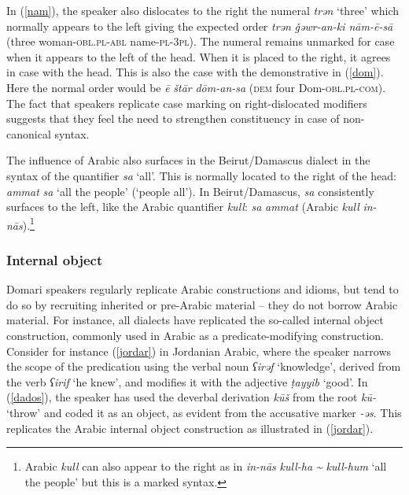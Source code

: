 \documentclass[output=paper]{langsci/langscibook}
\begin{document}
In (\ref{nam}), the speaker also dislocates to the right the numeral \textit{trən} ‘three’ which normally appears to the left giving the expected order \textit{trən} \textit{\v{g}əwr-an-ki nām-ē-sā} (three woman-\textsc{obl}.\textsc{pl}{}-\textsc{abl} name-\textsc{pl}{}-\textsc{3pl}). The numeral remains unmarked for case when it appears to the left of the head. When it is placed to the right, it agrees in case with the head. This is also the case with the demonstrative in (\ref{dom}). Here the normal order would be \textit{ē} \textit{štār} \textit{dōm-an-sa} (\textsc{dem} four Dom-\textsc{obl.pl}{}-\textsc{com}). The fact that speakers replicate case marking on right-dislocated modifiers suggests that they feel the need to strengthen constituency in case of non-canonical syntax.

The influence of Arabic also surfaces in the Beirut/Damascus dialect in the syntax of the quantifier \textit{sa} ‘all’. This is normally located to the right of the head: \textit{ammat} \textit{sa} ‘all the people’ (`people all'). In Beirut/Damascus, \textit{sa} consistently surfaces to the left, like the Arabic quantifier \textit{kull}: \textit{sa} \textit{ammat} (Arabic \textit{kull} \textit{in-nās}).\footnote{Arabic \textit{kull} can also appear to the right as in \textit{in-nās} \textit{kull-ha} \textit{{\textasciitilde} kull-hum} ‘all the people’ but this is a marked syntax.}


 \subsubsection{Internal object}

Domari speakers regularly replicate Arabic constructions and idioms, but tend to do so by recruiting inherited or pre-Arabic material -- they do not borrow Arabic material. For instance, all dialects have replicated the so-called internal object construction, commonly used in Arabic as a predicate-modifying construction. Consider for instance (\ref{jordar}) in Jordanian Arabic, where the speaker narrows the scope of the predication using the verbal noun \textit{ʕirəf} ‘knowledge’, derived from the verb \textit{ʕirif} ‘he knew’, and modifies it with the adjective \textit{ṭayyib} ‘good’. In (\ref{dados}), the speaker has used the deverbal derivation \textit{kūš} from the root \textit{kū-} ‘throw’ and coded it as an object, as evident from the accusative marker \textit{-əs}. This replicates the Arabic internal object construction as illustrated in (\ref{jordar}).
\end{document}
